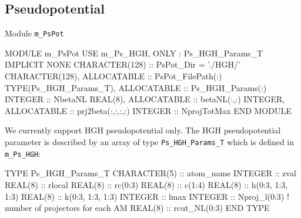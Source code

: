 \subsection{Pseudopotential}

Module {\tt m\_PsPot}

\begin{fortrancode}
MODULE m_PsPot
  USE m_Ps_HGH, ONLY : Ps_HGH_Params_T
  IMPLICIT NONE 
  CHARACTER(128) :: PsPot_Dir = './HGH/'
  CHARACTER(128), ALLOCATABLE :: PsPot_FilePath(:)
  TYPE(Ps_HGH_Params_T), ALLOCATABLE :: Ps_HGH_Params(:)
  INTEGER :: NbetaNL
  REAL(8), ALLOCATABLE :: betaNL(:,:)
  INTEGER, ALLOCATABLE :: prj2beta(:,:,:,:)
  INTEGER :: NprojTotMax
END MODULE 
\end{fortrancode}

We currently support HGH pseudopotential only.
The HGH pseudopotential parameter is described by an array of type {\tt Ps\_HGH\_Params\_T}
which is defined in {\tt m\_Ps\_HGH}:

\begin{fortrancode}
TYPE Ps_HGH_Params_T
  CHARACTER(5) :: atom_name
  INTEGER :: zval
  REAL(8) :: rlocal
  REAL(8) :: rc(0:3)
  REAL(8) :: c(1:4)
  REAL(8) :: h(0:3, 1:3, 1:3)
  REAL(8) :: k(0:3, 1:3, 1:3)
  INTEGER :: lmax
  INTEGER :: Nproj_l(0:3)  ! number of projectors for each AM
  REAL(8) :: rcut_NL(0:3)
END TYPE
\end{fortrancode}



